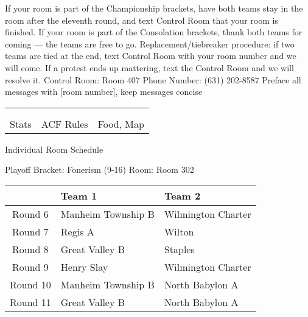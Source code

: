 \documentclass{article}%
\begin{document}
\vspace*{16pt}%
\linebreak%
If your room is part of the Championship brackets, have both teams stay in the room after the eleventh round, and text Control Room that your room is finished.\newline%
\newline%
If your room is part of the Consolation brackets, thank both teams for coming — the teams are free to go.\newline%
\newline%
Replacement/tiebreaker procedure: if two teams are tied at the end, text Control Room with your room number and we will come. If a protest ends up mattering, text the Control Room and we will resolve it.\newline%
\newline%
Control Room: Room 407\newline%
Phone Number: (631) 202{-}8587\newline%
Preface all messages with {[}room number{]}, keep messages concise%
\vspace*{30pt}%
\newline%
%
\begin{tabularx}{\textwidth}{YYY}%
  &  &  \\%
\\%
Stats&ACF Rules&Food, Map\\%
\end{tabularx}%
\newpage%
\begin{center}%
\begin{Huge}%
Individual Room Schedule%
\end{Huge}%
\vspace*{16pt}%
\linebreak%
\begin{Large}%
Playoff Bracket: Fonerism (9-16) \hfill Room: Room 302%
\end{Large}%
\end{center}%
%
\begin{tabularx}{\textwidth}{|c|Y|Y|}%
\hline%
&Team 1&Team 2\\%
\hline%
Round 6&Manheim Township B&Wilmington Charter\\%
Round 7&Regis A&Wilton\\%
Round 8&Great Valley B&Staples\\%
Round 9&Henry Slay&Wilmington Charter\\%
Round 10&Manheim Township B&North Babylon A\\%
Round 11&Great Valley B&North Babylon A\\%
\hline%
\end{tabularx}%
\end{document}
